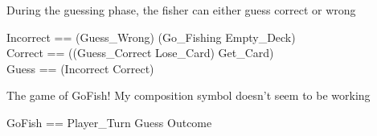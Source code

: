 During the guessing phase, the fisher can either guess correct or wrong
\begin{zed}
    Incorrect == (Guess\_Wrong) \land (Go\_Fishing \lor Empty\_Deck)\\
    Correct == ((Guess\_Correct \pipe Lose\_Card) \pipe Get\_Card) \\
    Guess == (Incorrect \lor Correct)
\end{zed}

The game of GoFish! My composition symbol doesn't seem to be working
\begin{zed}
    GoFish == Player\_Turn \semi Guess \semi Outcome\\
\end{zed}
    

